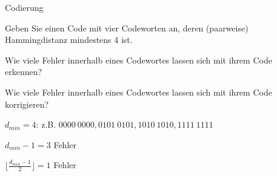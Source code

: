\documentclass{exercisesheet}
\begin{document}
\begin{exercises}{Codierung}
\item Geben Sie einen Code mit vier Codeworten an, deren (paarweise) Hammingdistanz mindestens 4 ist.
\item Wie viele Fehler innerhalb eines Codewortes lassen sich mit ihrem Code erkennen?
\item Wie viele Fehler innerhalb eines Codewortes lassen sich mit ihrem Code korrigieren?
\end{exercises}

\begin{solutions}
  \item $d_{min}=4$: z.B. $0000\ 0000, 0101\ 0101, 1010\ 1010, 1111\ 1111$
  \item $d_{min}-1=3$ Fehler
  \item $\lfloor\frac{d_{min}-1}{2}\rfloor=1$ Fehler
\end{solutions}
\end{document}
